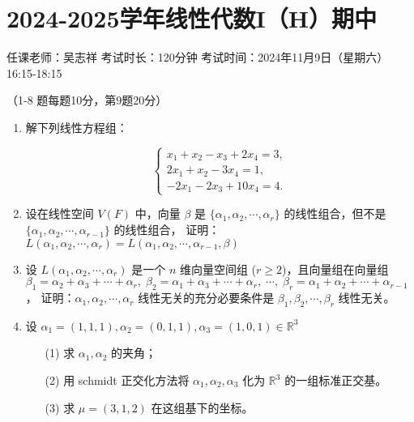 \section*{2024-2025学年线性代数I（H）期中}

\begin{center}
    任课老师：吴志祥\hspace{4em} 考试时长：120分钟
    考试时间：2024年11月9日（星期六）16:15-18:15
\end{center}

（1-8 题每题10分，第9题20分）

\begin{enumerate}
    \item 解下列线性方程组：

    \[
        \begin{cases}
        x_1 + x_2 - x_3 + 2x_4 = 3, \\
        2x_1 + x_2 - 3x_4 = 1, \\
        -2x_1 - 2x_3 + 10x_4 = 4.
        \end{cases}
    \]

    \item 设在线性空间 \(V(F)\) 中，向量 \(\beta\) 是 \(\{\alpha_1,\alpha_2,\cdots,\alpha_r\}\) 的线性组合，但不是 \(\{\alpha_1,\alpha_2,\cdots,\alpha_{r-1}\}\) 的线性组合，
    证明：\(L(\alpha_1,\alpha_2,\cdots,\alpha_r)=L(\alpha_1,\alpha_2,\cdots,\alpha_{r-1},\beta)\)

    \item 设 \(L(\alpha_1,\alpha_2,\cdots,\alpha_r)\) 是一个 \(n\) 维向量空间组 (\(r\geq2\))，且向量组在向量组
    \(
    \beta_1 = \alpha_2 + \alpha_3 + \cdots + \alpha_r, \;
    \beta_2 = \alpha_1 + \alpha_3 + \cdots + \alpha_r, \;
    \cdots ,\;
    \beta_r = \alpha_1 + \alpha_2 + \cdots + \alpha_{r-1}
    \)，
    证明：\(\alpha_1,\alpha_2,\cdots,\alpha_r\) 线性无关的充分必要条件是 \(\beta_1,\beta_2,\cdots,\beta_r\) 线性无关。

    \item 设 \(\alpha_1=(1,1,1),\alpha_2=(0,1,1),\alpha_3=(1,0,1)\in\mathbb{R}^3\)
    \begin{enumerate}
        \item[(1)] 求 \(\alpha_1,\alpha_2\) 的夹角；
        \item[(2)] 用 schmidt 正交化方法将 \(\alpha_1,\alpha_2,\alpha_3\) 化为 \(\mathbb{R}^3\) 的一组标准正交基。
        \item[(3)] 求 \(\mu=(3,1,2)\) 在这组基下的坐标。
    \end{enumerate}


\end{enumerate}
